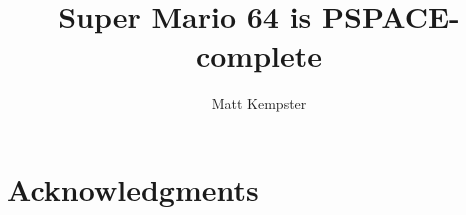 \documentclass[10pt, titlepage]{article}
\begin{document}
\title{Super Mario 64 is PSPACE-complete}
\author{Matt Kempster}
\date{}
\maketitle




\setlength\emergencystretch{\hsize}






\section*{Acknowledgments}

\nocite{*}
% 
% 
\end{document}
